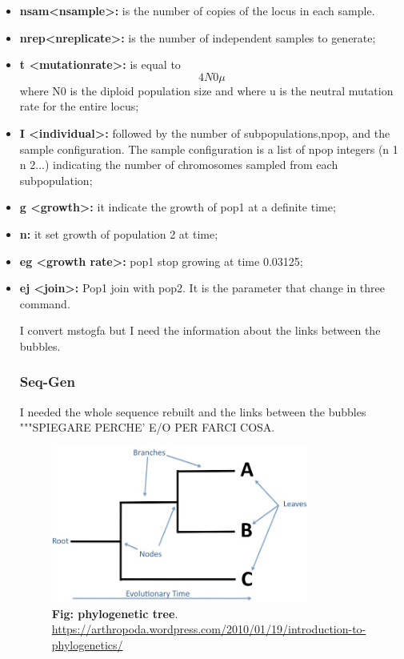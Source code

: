 \begin{itemize}
\item\textbf{nsam<nsample>:}
is the number of copies of the locus in each sample.

\item\textbf{nrep<nreplicate>:}
is the number of independent samples to generate;


\item\textbf{t <mutationrate>:}
is equal to $$4N0\mu$$ where N0 is the diploid population size and where u is the neutral mutation rate for the entire locus;

\item\textbf{I <individual>:}
followed by the number of subpopulations,npop, and the sample configuration. The sample configuration is a list of npop integers (n 1 n 2...) indicating the number of chromosomes sampled from each subpopulation;

\item\textbf{g <growth>:}
 it indicate the growth of pop1 at a definite time;

\item\textbf{n:}
it set growth of population 2 at time; 

\item\textbf{eg <growth rate>:}
pop1 stop growing at time 0.03125;

\item\textbf{ej <join>:}
Pop1 join with pop2. It is the parameter that change in three command. 

I convert mstogfa but I need the information about the links between the bubbles.  

\subsubsection{Seq-Gen}
I needed the whole sequence rebuilt and the links between the bubbles """SPIEGARE PERCHE' E/O PER FARCI COSA.

\begin{figure}[H]
\centering
\includegraphics[width=0.80\textwidth]{fig/phylogenies.jpg}
\decoRule
\caption{\textbf{Fig: phylogenetic tree}. 
\url{https://arthropoda.wordpress.com/2010/01/19/introduction-to-phylogenetics/}}
\label{fig:phylogenies.jpg}
\end{figure}



\end{itemize}
